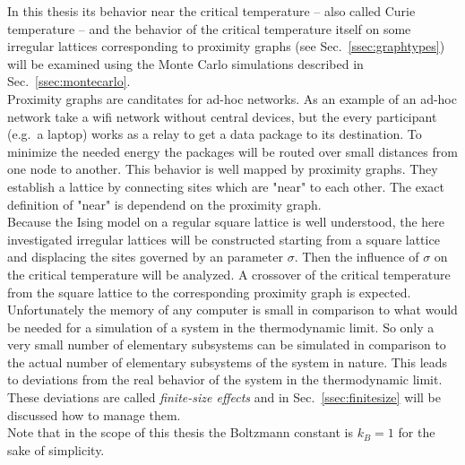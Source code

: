 In this thesis its behavior near the critical temperature -- also called
Curie temperature -- and the behavior of the critical temperature itself
on some irregular lattices corresponding to proximity graphs
(see Sec.\ \ref{ssec:graphtypes}) will be examined using the Monte
Carlo simulations described in Sec.\ \ref{ssec:montecarlo}.\\
Proximity graphs are canditates for ad-hoc networks. As an example of an
ad-hoc network take a wifi network without central devices, but the every
participant (e.g.\ a laptop) works as a relay to get a data package to its
destination. To minimize the needed energy the packages will be routed
over small distances from one node to another. This behavior is well mapped
by proximity graphs. They establish a lattice by connecting sites which
are "near" to each other. The exact definition of "near" is dependend on
the proximity graph.\\
Because the Ising model on a regular square lattice is well understood,
the here investigated irregular lattices will be constructed starting from
a square lattice and displacing the sites governed by an parameter \(\sigma\).
Then the influence of \(\sigma\) on the critical temperature will be
analyzed. A crossover of the critical temperature from the square lattice
to the corresponding proximity graph is expected.\\

Unfortunately the memory of any computer is small in comparison to what
would be needed for a simulation of a system in the
thermodynamic limit. So only a very small number of elementary subsystems can be
simulated in comparison to the actual number of elementary subsystems
of the system in nature. This leads to deviations from the real behavior
of the system in the thermodynamic limit. These deviations are called
\emph{finite-size effects} and in Sec.\ \ref{ssec:finitesize} will be
discussed how to manage them.\\

Note that in the scope of this thesis the Boltzmann constant is \(k_{B}=1\)
for the sake of simplicity.
